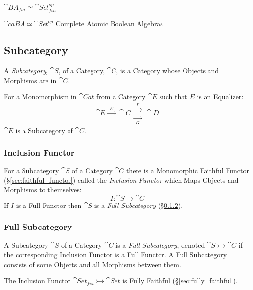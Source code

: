 $\cat{BA}_{fin} \simeq \cat{Set}_{fin}^{op}$

$\cat{caBA} \simeq \cat{Set}^{op}$ Complete Atomic Boolean
Algebras %



\subsection{Subcategory}\label{sec:subcategory}

A \emph{Subcategory}, $\cat{S}$, of a Category, $\cat{C}$, is a
Category whose Objects and Morphisms are in $\cat{C}$.

For a Monomorphism in $\cat{Cat}$ from a Category $\cat{E}$ such
that $E$ is an Equalizer:
\[
  \cat{E} \xrightarrow{\;\;E\;\;} \cat{C}
  \begin{matrix}
  \xrightarrow{\;\;F\;\;}\\
  \xrightarrow[\;\;G\;\;]{}
  \end{matrix}
  \cat{D}
\]
$\cat{E}$ is a Subcategory of $\cat{C}$.



\subsubsection{Inclusion Functor}\label{sec:inclusion_functor}

For a Subcategory $\cat{S}$ of a Category $\cat{C}$ there is a
Monomorphic Faithful Functor (\S\ref{sec:faithful_functor}) called the
\emph{Inclusion Functor} which Maps Objects and Morphisms to
themselves:
\[
  I : \cat{S} \rightarrow \cat{C}
\]
If $I$ is a Full Functor then $\cat{S}$ is a \emph{Full
  Subcategory} (\S\ref{sec:full_subcategory}).



\subsubsection{Full Subcategory}\label{sec:full_subcategory}

A Subcategory $\cat{S}$ of a Category $\cat{C}$ is a \emph{Full
  Subcategory}, denoted $\cat{S} \rightarrowtail \cat{C}$ if the
corresponding Inclusion Functor is a Full Functor. A Full Subcategory
consists of some Objects and all Morphisms between them.

The Inclusion Functor $\cat{Set}_{fin} \rightarrowtail
\cat{Set}$ is Fully Faithful (\S\ref{sec:fully_faithful}).



